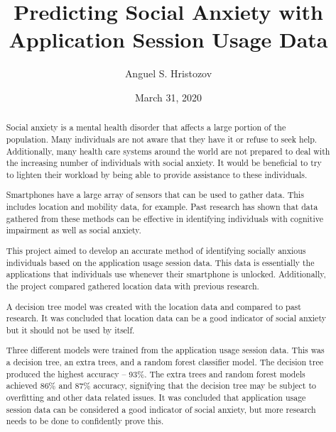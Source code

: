 \documentclass{l4proj}
\begin{document}
\title{Predicting Social Anxiety with Application Session Usage Data} %
\author{Anguel S. Hristozov}
\date{March 31, 2020}

\maketitle

\begin{abstract}
    Social anxiety is a mental health disorder that affects a large portion of the population. Many individuals are not aware that they have it or refuse to seek help. Additionally, many health care systems around the world are not prepared to deal with the increasing number of individuals with social anxiety. It would be beneficial to try to lighten their workload by being able to provide assistance to these individuals.
    
    Smartphones have a large array of sensors that can be used to gather data. This includes location and mobility data, for example. Past research has shown that data gathered from these methods can be effective in identifying individuals with cognitive impairment as well as social anxiety.
    
    This project aimed to develop an accurate method of identifying socially anxious individuals based on the application usage session data. This data is essentially the applications that individuals use whenever their smartphone is unlocked. Additionally, the project compared gathered location data with previous research.
    
    A decision tree model was created with the location data and compared to past research. It was concluded that location data can be a good indicator of social anxiety but it should not be used by itself.
    
    Three different models were trained from the application usage session data. This was a decision tree, an extra trees, and a random forest classifier model. The decision tree produced the highest accuracy -- 93\%. The extra trees and random forest models achieved 86\% and 87\% accuracy, signifying that the decision tree may be subject to overfitting and other data related issues. It was concluded that application usage session data can be considered a good indicator of social anxiety, but more research needs to be done to confidently prove this.
\end{abstract}
\end{document}
